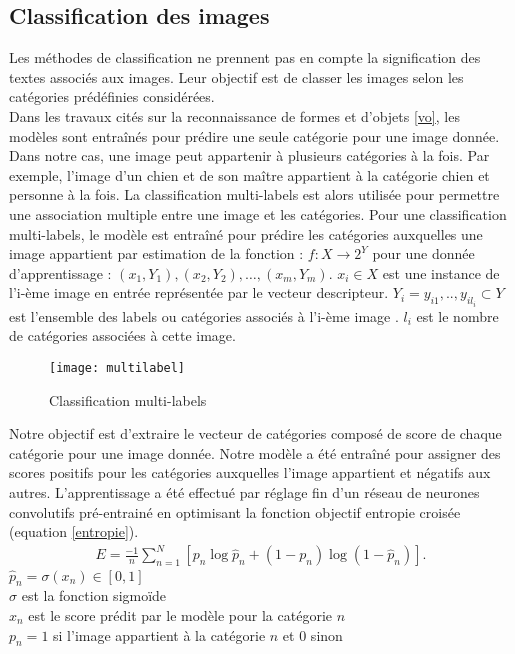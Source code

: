 \subsection{Classification des images} \label{classification}

\qquad Les méthodes de classification ne prennent pas en compte la signification des textes associés aux images. Leur objectif est de classer les images selon les catégories prédéfinies considérées.\\
Dans les travaux cités sur la reconnaissance de formes et d'objets \ref{vo}, les modèles sont entraînés pour prédire une seule catégorie pour une image donnée. Dans notre cas, une image peut appartenir à plusieurs catégories à la fois. Par exemple, l'image d'un chien et de son maître appartient à la catégorie chien et personne à la fois. La classification multi-labels est alors utilisée pour permettre une association multiple entre une image et les catégories.
	Pour une classification multi-labels, le modèle est entraîné pour prédire les catégories auxquelles une image appartient par estimation de la fonction :
$f : X \rightarrow 2^Y $ pour une donnée d'apprentissage : ${(x_1, Y_1), (x_2,Y_2),…, (x_m,Y_m)}$.
$x_i \in X$ est une instance de l’i-ème image en entrée représentée par le vecteur descripteur.
$Y_i = {y_{i1},..,y_{il_{i}}} \subset Y$ est l'ensemble des labels ou catégories associés à l'i-ème image . $l_i$ est le nombre de catégories associées à cette image.
\medskip
\begin{figure}[h]
	\begin{center}
		\texttt{[image: multilabel]}
		\caption{Classification multi-labels}
	\end{center}
\end{figure}

Notre objectif est d'extraire le vecteur de catégories composé de score de chaque catégorie pour une image donnée. Notre modèle a été entraîné pour assigner des scores positifs pour les catégories auxquelles l'image appartient et négatifs aux autres. L'apprentissage a été effectué par réglage fin d'un réseau de neurones convolutifs pré-entrainé en optimisant la fonction objectif entropie croisée (equation \ref{entropie}).\\
\begin{eqnarray}
\label{entropie}
E = \frac{-1}{n} \sum_{n=1}^{N} [p_n \log \hat{p}_n + (1-p_n) \log(1- \hat{p}_n)].
\end{eqnarray}
$\hat{p}_n = \sigma(x_n) \in [0,1]$\\
$\sigma$ est la fonction sigmoïde \\
$x_n$ est le score prédit par le modèle pour la catégorie $n$\\
$p_n = 1$ si l'image appartient à la catégorie $n$ et $0$ sinon\\ 

